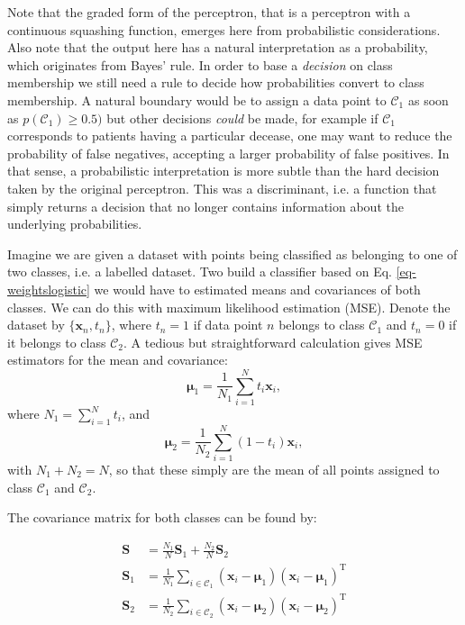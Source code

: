      Note that the graded form of the perceptron, that is a perceptron with a continuous squashing function, emerges here from probabilistic considerations. Also note that
     the output here has a natural interpretation as a probability, which originates from Bayes' rule. In order to base a \emph{decision} on class membership
     we still need a rule to decide how probabilities convert to class membership. A natural boundary would be to assign a data point to $\mathcal{C}_1$ as soon
     as $p(\mathcal{C}_1) \ge 0.5)$ but other decisions \emph{could} be made, for example if $\mathcal{C}_1$ corresponds to patients having a particular decease,
     one may want to reduce the probability of false negatives, accepting a larger probability of false positives. In that sense, a probabilistic interpretation
     is more subtle than the hard decision taken by the original perceptron. This was a discriminant, i.e. a function that simply returns a decision that
     no longer contains information about the underlying probabilities.

    
     Imagine we are given a dataset with points being classified as belonging to one of two classes, i.e. a labelled dataset. Two build a classifier based on
     Eq. \ref{eq-weightslogistic} we would have to estimated means and covariances of both classes. We can do this with maximum likelihood estimation (MSE).
     Denote the dataset by $\{\boldsymbol{x}_n, t_n\}$, where $t_n = 1$ if data point $n$ belongs to class $\mathcal{C}_1$  and $t_n =0$ if it belongs to
     class $\mathcal{C}_2$. A tedious but straightforward calculation gives MSE estimators for the mean and covariance:
     \begin{equation}
       \boldsymbol{\mu}_1 = \frac{1}{N_1}\sum^N_{i=1} t_i \boldsymbol{x}_i,
     \end{equation}
     where $N_1 = \sum^N_{i=1} t_i$, and
     \begin{equation}
       \boldsymbol{\mu}_2 = \frac{1}{N_2}\sum^N_{i=1}(1- t_i) \boldsymbol{x}_i,
     \end{equation}
     with $N_1 + N_2 = N$,
     so that these simply are the mean of all points assigned to class $\mathcal{C}_1$ and $\mathcal{C}_2$.

     The covariance matrix for both classes can be found by:
     
\begin{align*}
\mathbf{S} &=\frac{N_{1}}{N} \mathbf{S}_{1}+\frac{N_{2}}{N} \mathbf{S}_{2} \\
\mathbf{S}_{1} &=\frac{1}{N_{1}} \sum_{i \in \mathcal{C}_{1}}\left(\mathbf{x}_{i}-\boldsymbol{\mu}_{1}\right)\left(\mathbf{x}_{i}-\boldsymbol{\mu}_{1}\right)^{\mathrm{T}} \\
\mathbf{S}_{2} &=\frac{1}{N_{2}} \sum_{i \in \mathcal{C}_{2}}\left(\mathbf{x}_{i}-\boldsymbol{\mu}_{2}\right)\left(\mathbf{x}_{i}-\boldsymbol{\mu}_{2}\right)^{\mathrm{T}}
\end{align*}


